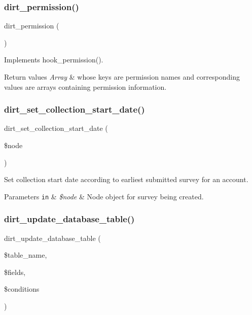 \subsubsection{\texorpdfstring{dirt\+\_\+permission()}{dirt\_permission()}}
{\footnotesize\ttfamily dirt\+\_\+permission (\begin{DoxyParamCaption}{ }\end{DoxyParamCaption})}

Implements hook\+\_\+permission().


\begin{DoxyRetVals}{Return values}
{\em Array} & whose keys are permission names and corresponding values are arrays containing permission information. \\
\hline
\end{DoxyRetVals}
\mbox{\label{dirt_8module_a532e08f64223e31e9ae63bd96be99b04}} 
\subsubsection{\texorpdfstring{dirt\+\_\+set\+\_\+collection\+\_\+start\+\_\+date()}{dirt\_set\_collection\_start\_date()}}
{\footnotesize\ttfamily dirt\+\_\+set\+\_\+collection\+\_\+start\+\_\+date (\begin{DoxyParamCaption}\item[{}]{\$node }\end{DoxyParamCaption})}

Set collection start date according to earliest submitted survey for an account.


\begin{DoxyParams}[1]{Parameters}
\mbox{\tt in}  & {\em \$node} & Node object for survey being created. \\
\hline
\end{DoxyParams}
\mbox{\label{dirt_8module_aed4cad0bd17b2644903d618b42b2871d}} 
\subsubsection{\texorpdfstring{dirt\+\_\+update\+\_\+database\+\_\+table()}{dirt\_update\_database\_table()}}
{\footnotesize\ttfamily dirt\+\_\+update\+\_\+database\+\_\+table (\begin{DoxyParamCaption}\item[{}]{\$table\+\_\+name,  }\item[{}]{\$fields,  }\item[{}]{\$conditions }\end{DoxyParamCaption})}

